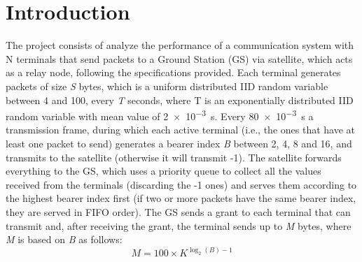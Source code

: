 \chapter{Introduction}
The project consists of analyze the performance of a communication system with N terminals that send packets to a Ground Station (GS) via satellite, which acts as a relay node, 
following the specifications provided. Each terminal generates packets of size \emph{S} bytes, which is a uniform distributed IID random variable between 4 and 100, every 
\emph{T} seconds, where T is an exponentially distributed IID random variable with mean value of \qty{2e-3}{s}. Every \qty{80e-3}{s} a transmission frame, during which each active 
terminal (i.e., the ones that have at least one packet to send) generates a bearer index \emph{B} between 2, 4, 8 and 16, and transmits to the satellite (otherwise it will transmit -1). 
The satellite forwards everything to the GS, which uses a priority queue to collect all the values received from the terminals (discarding the -1 ones) and serves them according to 
the highest bearer index first (if two or more packets have the same bearer index, they are served in FIFO order). The GS sends a grant to each terminal that can transmit and, after
receiving the grant, the terminal sends up to \emph{M} bytes, where \emph{M} is based on \emph{B} as follows:
\begin{equation}
M = 100 \times K^{\log_2(B) - 1}
\end{equation}